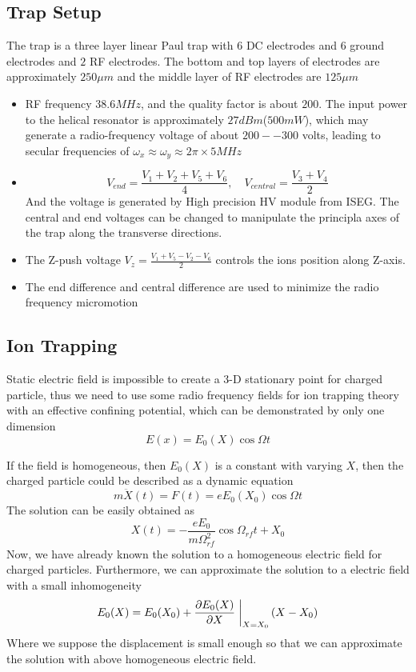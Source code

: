 \subsection{Trap Setup} %
\label{sub:trap_setup}
The trap is a three layer linear Paul trap with $6$ DC electrodes and $6$ ground electrodes and $2$ RF electrodes. The bottom and top layers of electrodes are approximately $250\unit{\mu m}$ and the middle layer of RF electrodes are $125\unit{\mu m}$
\begin{itemize}
    \item RF frequency $38.6\unit{MHz}$, and the quality factor is about $200$. The input power to the helical resonator is approximately $27\unit{dBm}$($500\unit{mW}$), which may generate a radio-frequency voltage of about $200--300$ volts, leading to secular frequencies of $\omega_x\approx\omega_y\approx 2\pi \times 5\unit{MHz}$
    \item
    \[V_{end}=\frac{V_1+V_2+V_5+V_6}{4},\quad V_{central}=\frac{V_3+V_4}{2}\]
    And the voltage is generated by High precision HV module from ISEG. The central and end voltages can be changed to manipulate the principla axes of the trap along the transverse directions.
    \item
    The Z-push voltage $V_z=\frac{V_1+V_5-V_2-V_6}{2}$ controls the ions position along Z-axis.
    \item The end difference and central difference are used to minimize the radio frequency micromotion
\end{itemize}


\subsection{Ion Trapping} %
\label{sub:ion_trapping}
Static electric field is impossible to create a 3-D stationary point for charged particle, thus we need to use some radio frequency fields for ion trapping theory with an effective confining potential, which can be demonstrated by only one dimension
\begin{equation}
    E(x)=E_0(X)\cos\Omega t
\end{equation}

If the field is homogeneous, then $E_0(X)$ is a constant with varying $X$, then the charged particle could be described as a dynamic equation
\begin{equation}\label{eq:dynamics}
    m\ddot{X}(t)=F(t)=eE_0(X_0)\cos\Omega t
\end{equation}
The solution can be easily obtained as
\begin{equation}
    X(t)=-\frac{eE_0}{m\Omega_{rf}^2}\cos\Omega_{rf}t+X_0
\end{equation}
Now, we have already known the solution to a homogeneous electric field for charged particles. Furthermore, we can approximate the solution to a electric field with a small inhomogeneity
\begin{equation}
    E_0(X)=E_0(X_0)+\pdv{E_0(X)}{X}\eval{}_{X=X_0}\qty(X-X_0)
\end{equation}
Where we suppose the displacement is small enough so that we can approximate the solution with above homogeneous electric field.

